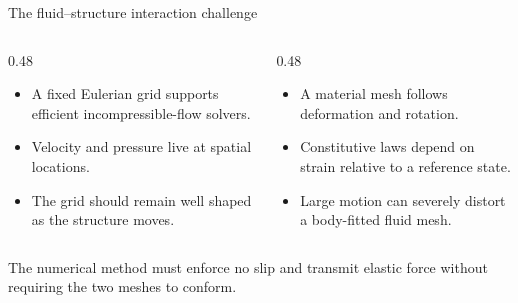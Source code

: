 \documentclass[aspectratio=169,11pt]{beamer}
\begin{document}
\begin{frame}{The fluid--structure interaction challenge}
\begin{columns}[T,onlytextwidth]
\begin{column}{0.48\textwidth}
\begin{itemize}\itemsep6pt
  \item A fixed Eulerian grid supports efficient incompressible-flow solvers.
  \item Velocity and pressure live at spatial locations.
  \item The grid should remain well shaped as the structure moves.
\end{itemize}
\end{column}
\begin{column}{0.48\textwidth}
\begin{itemize}\itemsep6pt
  \item A material mesh follows deformation and rotation.
  \item Constitutive laws depend on strain relative to a reference state.
  \item Large motion can severely distort a body-fitted fluid mesh.
\end{itemize}
\end{column}
\end{columns}

\medskip
\begin{punchbox}
The numerical method must enforce no slip and transmit elastic force without requiring the two meshes to conform.
\end{punchbox}
\end{frame}
\end{document}
